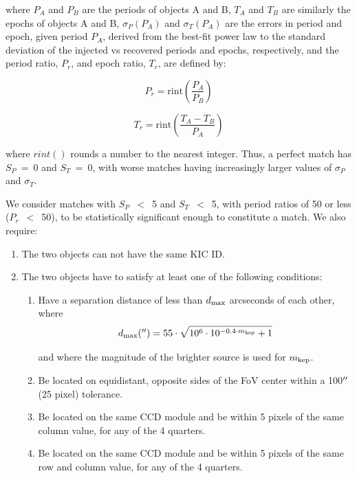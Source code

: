 \noindent where $P_{A}$ and $P_{B}$ are the periods of objects A and B, $T_{A}$ and $T_{B}$ are similarly the epochs of objects A and B, $\sigma_{P}(P_{A})$ and $\sigma_{T}(P_{A})$ are the errors in period and epoch, given period $P_{A}$, derived from the best-fit power law to the standard deviation of the injected vs recovered periods and epochs, respectively, and the period ratio, $P_{r}$, and epoch ratio, $T_{r}$, are defined by:

\begin{equation}
P_{r} = \textrm{rint}\left(\frac{P_{A}}{P_{B}}\right)
\end{equation}

\begin{equation}
T_{r} = \textrm{rint}\left(\frac{T_{A} - T_{B}}{P_{A}}\right)
\end{equation}


\noindent where $rint()$ rounds a number to the nearest integer. Thus, a perfect match has $S_{P}$~=~0 and  $S_{T}$~=~0, with worse matches having increasingly larger values of $ \sigma_{P}$ and $ \sigma_{T}$. 

We consider matches with $S_{P}$~$<$~5 and $S_{T}$~$<$~5, with period ratios of 50 or less ($P_{r}$~$<$~50), to be statistically significant enough to constitute a match. We also require:

\begin{enumerate}

\item The two objects can not have the same KIC ID.

\item The two objects have to satisfy at least one of the following conditions: 

    \begin{enumerate}
    
    \item Have a separation distance of less than $d_{\rm max}$ arcseconds of each other, where
    \begin{equation}
    \label{disteq}
    d_{\rm max}(\arcsec) = 55\cdot\sqrt{10^{6}\cdot 10^{-0.4 \cdot m_{\rm kep}}+1}
    \end{equation}

\noindent and where the magnitude of the brighter source is used for $m_{\rm kep}$.  

    \item Be located on equidistant, opposite sides of the FoV center within a 100$\mbox{$^{\prime\prime}$}$ (25 pixel) tolerance.
    
    \item Be located on the same CCD module and be within 5 pixels of the same column value, for any of the 4 quarters.
    
    \item Be located on the same CCD module and be within 5 pixels of the same row and column value, for any of the 4 quarters.

   \end{enumerate}

\end{enumerate}


